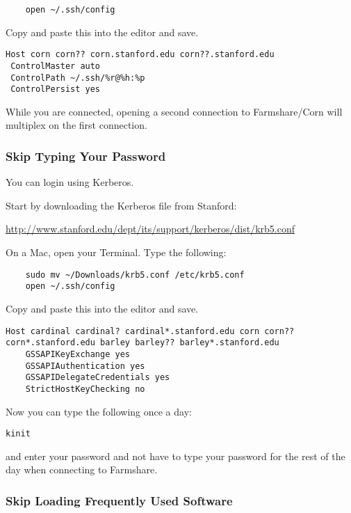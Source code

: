 \documentclass[12pt]{article}
\begin{document}
\begin{lstlisting}
	open ~/.ssh/config
\end{lstlisting}

Copy and paste this into the editor and save.

\begin{lstlisting}
Host corn corn?? corn.stanford.edu corn??.stanford.edu
 ControlMaster auto
 ControlPath ~/.ssh/%r@%h:%p
 ControlPersist yes
\end{lstlisting}

While you are connected, opening a second connection to Farmshare/Corn will multiplex on the first connection.

\subsubsection{Skip Typing Your Password}

You can login using Kerberos.

Start by downloading the Kerberos file from Stanford:

\url{http://www.stanford.edu/dept/its/support/kerberos/dist/krb5.conf}

On a Mac, open your Terminal. Type the following:

\begin{lstlisting}                   
	sudo mv ~/Downloads/krb5.conf /etc/krb5.conf
	open ~/.ssh/config
\end{lstlisting}

Copy and paste this into the editor and save.

\begin{lstlisting}
Host cardinal cardinal? cardinal*.stanford.edu corn corn?? corn*.stanford.edu barley barley?? barley*.stanford.edu
    GSSAPIKeyExchange yes
    GSSAPIAuthentication yes
    GSSAPIDelegateCredentials yes
    StrictHostKeyChecking no
\end{lstlisting}


Now you can type the following once a day:

\begin{lstlisting}
kinit
\end{lstlisting}

and enter your password and not have to type your password for the rest of the day when connecting to Farmshare.


\subsubsection{Skip Loading Frequently Used Software}
\end{document}
